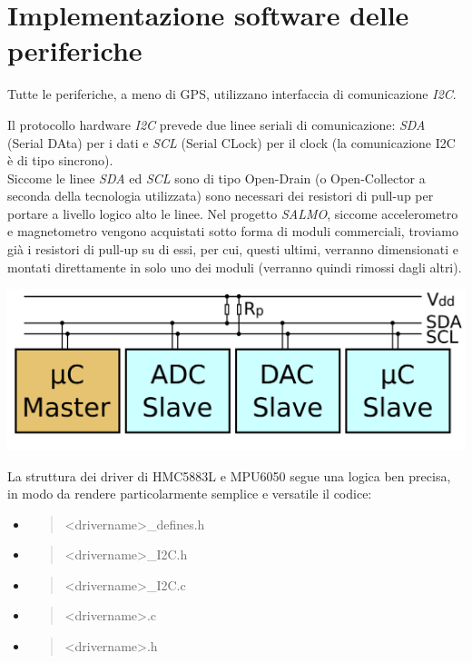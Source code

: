 \hypertarget{implementazione-software-delle-periferiche}{%
\section{Implementazione software delle
periferiche}\label{implementazione-software-delle-periferiche}}

Tutte le periferiche, a meno di GPS, utilizzano interfaccia di
comunicazione \emph{I2C}.

Il protocollo hardware \emph{I2C} prevede due linee seriali di
comunicazione: \emph{SDA} (Serial DAta) per i dati e \emph{SCL} (Serial
CLock) per il clock (la comunicazione I2C è di tipo sincrono).\\
Siccome le linee \emph{SDA} ed \emph{SCL} sono di tipo Open-Drain (o
Open-Collector a seconda della tecnologia utilizzata) sono necessari dei
resistori di pull-up per portare a livello logico alto le linee. Nel
progetto \emph{SALMO}, siccome accelerometro e magnetometro vengono
acquistati sotto forma di moduli commerciali, troviamo già i resistori
di pull-up su di essi, per cui, questi ultimi, verranno dimensionati e
montati direttamente in solo uno dei moduli (verranno quindi rimossi
dagli altri).

\begin{center}
\includegraphics[scale=0.2]{figures/image61.png}
\captionsetup{type=figure}
\end{center}

La struttura dei driver di HMC5883L e MPU6050 segue una logica ben
precisa, in modo da rendere particolarmente semplice e versatile il
codice:

\begin{itemize}
\item
  \begin{quote}
  \textless drivername\textgreater\_defines.h
  \end{quote}
\item
  \begin{quote}
  \textless drivername\textgreater\_I2C.h
  \end{quote}
\item
  \begin{quote}
  \textless drivername\textgreater\_I2C.c
  \end{quote}
\item
  \begin{quote}
  \textless drivername\textgreater.c
  \end{quote}
\item
  \begin{quote}
  \textless drivername\textgreater.h
  \end{quote}
\end{itemize}

